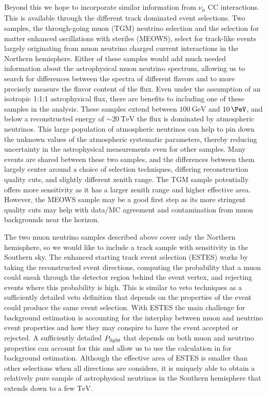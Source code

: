 Beyond this we hope to incorporate similar information from $\nu_\mu$ CC interactions.
This is available through the different track dominated event selections.
Two samples, the through-going muon (TGM) neutrino selection and the selection for matter enhanced oscillations with steriles (MEOWS), select for track-like events largely originating from muon neutrino charged current interactions in the Northern hemisphere.
Either of these samples would add much needed information about the astrophysical muon neutrino spectrum, allowing us to search for differences between the spectra of different flavors and to more precisely measure the flavor content of the flux.
Even under the assumption of an isotropic 1:1:1 astrophysical flux, there are benefits to including one of these samples in the analysis.
These samples extend between $\SI{100}\GeV$ and $\SI{10}\PeV$, and below a reconstructed energy of $\sim\SI{20}\TeV$ the flux is dominated by atmospheric neutrinos.
This large population of atmospheric neutrinos can help to pin down the unknown values of the atmospheric systematic parameters, thereby reducing uncertainty in the astrophysical measurements even for other samples.
Many events are shared between these two samples, and the differences between them largely center around a choice of selection techniques, differing reconstruction quality cuts, and slightly different zenith range.
The TGM sample potentially offers more sensitivity as it has a larger zenith range and higher effective area.
However, the MEOWS sample may be a good first step as its more stringent quality cuts may help with data/MC agreement and contamination from muon backgrounds near the horizon.

The two muon neutrino samples described above cover only the Northern hemisphere, so we would like to include a track sample with sensitivity in the Southern sky.
The enhanced starting track event selection (ESTES) works by taking the reconstructed event directions, computing the probability that a muon could sneak through the detector region behind the event vertex, and rejecting events where this probability is high.
This is similar to veto techniques as a sufficiently detailed veto definition that depends on the properties of the event could produce the same event selection.
With ESTES the main challenge for background estimation is accounting for the interplay between muon and neutrino event properties and how they may conspire to have the event accepted or rejected.
A sufficiently detailed $P_{\rm light}$ that depends on both muon and neutrino properties can account for this and allow us to use the calculation in  for background estimation.
Although the effective area of ESTES is smaller than other selections when all directions are considers, it is uniquely able to obtain a relatively pure sample of astrophysical neutrinos in the Southern hemisphere that extends down to a few $\si\TeV$.

